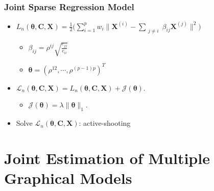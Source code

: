 \documentclass{beamer}
\newcommand{\boldtheta}{{\boldsymbol{\theta}}}
\begin{document}

\begin{frame}
\frametitle{Joint Sparse Regression Model}

\begin{itemize}
\item $L_n(\boldtheta, \mathbf{C}, \mathbf{X}) = \frac{1}{2}\Big( \sum_{i = 1}^p w_i \| \mathbf{X}^{(i)} - \sum_{\substack{j \neq i}} \beta_{ij} \mathbf{X}^{(j)} \|^2 \Big) $
    \begin{itemize}
    \item $\beta_{ij} = \rho^{ij} \sqrt{\frac{c_{jj}}{c_{ii}}}$
    \item $\boldtheta = (\rho^{12}, \cdots, \rho^{(p-1)p})^T$
    \end{itemize}
\item $\mathcal{L}_n(\boldtheta, \mathbf{C}, \mathbf{X})  = L_n(\boldtheta, \mathbf{C}, \mathbf{X})  + \mathcal{J}(\boldtheta)$.
    \begin{itemize}
    \item $\mathcal{J}(\boldtheta) = \lambda \| \boldtheta \|_1$.
    \end{itemize}
\item Solve $\mathcal{L}_n(\boldtheta, \mathbf{C}, \mathbf{X}) $: active-shooting
\end{itemize}

\end{frame}

\section{Joint Estimation of Multiple Graphical Models}
\end{document}
